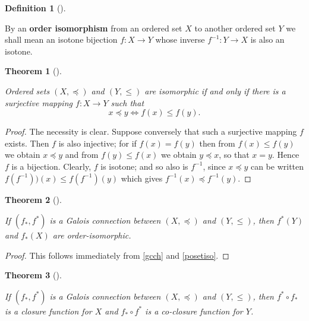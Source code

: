 \documentclass[
  letterpaper,
  10pt,
  reqno,
  twopage,
  openany]{book}
\theoremstyle{plain}
\theoremstyle{definition}
\theoremstyle{definition}
\newtheorem{definition}{Definition}[chapter]
\theoremstyle{definition}
\theoremstyle{plain}
\theoremstyle{plain}
\newtheorem{theorem}{Theorem}[chapter]
\theoremstyle{remark}
\begin{document}
\leavevmode{}%
\begin{definition}[]\label{def-order-isomorphism}

By an  \textbf{order isomorphism} from an
ordered set \(X\) to another ordered set \(Y\) we shall mean an isotone
bijection \(f:X\to Y\) whose inverse \(f^{-1}: Y\to X\) is also an
isotone.

\end{definition}

\leavevmode{}%
\begin{theorem}[]\label{thm-posetiso}

Ordered sets \((X,\preceq)\) and \((Y,\leqslant)\) are isomorphic if and
only if there is a surjective mapping \(f:X\to Y\) such that \[
x\preceq y  \Longleftrightarrow f(x)\leqslant f(y).
\]

\end{theorem}

\begin{proof}

The necessity is clear. Suppose conversely that such a surjective
mapping \(f\) exists. Then \(f\) is also injective; for if \(f(x)=f(y)\)
then from \(f(x)\leqslant f(y)\) we obtain \(x\preceq y\) and from
\(f(y)\leqslant f(x)\) we obtain \(y\preceq x\), so that \(x=y\). Hence
\(f\) is a bijection. Clearly, \(f\) is isotone; and so also is
\(f^{-1}\), since \(x\preceq y\) can be written
\(f(f^{-1}))(x)\leqslant f(f^{-1})(y)\) which gives
\(f^{-1}(x)\preceq f^{-1}(y)\).

\end{proof}

\leavevmode{}%
\begin{theorem}[]\label{thm-calcprop1}

If \((f_*, f^*)\) is a Galois connection between \((X,\preceq)\) and
\((Y,\leqslant)\), then \(f^*(Y)\) and \(f_*(X)\) are order-isomorphic.

\end{theorem}

\begin{proof}

This follows immediately from \ref{gcch} and \ref{posetiso}.

\end{proof}

\leavevmode{}%
\begin{theorem}[]\label{thm-}

If \((f_*, f^*)\) is a Galois connection between \((X,\preceq)\) and
\((Y,\leqslant)\), then \(f^*\circ f_*\) is a closure function for \(X\)
and \(f_*\circ f^*\) is a co-closure function for \(Y\).

\end{theorem}
\end{document}
